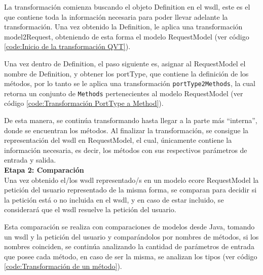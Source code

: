

La transformación comienza buscando el objeto Definition en el wsdl, este es el que contiene toda la información necesaria para poder llevar adelante la transformación. Una vez obtenido la Definition, le aplica una transformación model2Request, obteniendo de esta forma el modelo RequestModel (ver código \ref{code:Inicio de la transformación QVT}).



Una vez dentro de Definition, el paso siguiente es,  asignar al RequestModel el nombre de Definition, y obtener los portType, que contiene la definición de los métodos, por lo tanto se le aplica una transformación \texttt{portType2Methods}, la cual retorna un conjunto de \texttt{Methods} pertenecientes al modelo RequestModel (ver código \ref{code:Transformación PortType a Method}).



De esta manera, se continúa transformando hasta llegar a la parte más “interna”, donde se encuentran los métodos.  Al finalizar la transformación, se consigue la representación del wsdl en RequestModel, el cual, únicamente contiene la información necesaria, es decir, los métodos con sus respectivos parámetros de entrada y salida.\\

\textbf{Etapa 2: Comparación}\\

Una vez obtenido el/los wsdl representado/s en un modelo ecore RequestModel la petición del usuario representado de la misma forma, se comparan para decidir si la petición está o no incluida en el wsdl, y en caso de estar incluido, se considerará que el wsdl resuelve la petición del usuario.

Esta comparación se realiza con comparaciones de modelos desde Java, tomando un wsdl y la petición del usuario y comparándolos por nombres de métodos, si los nombres coinciden, se continúa analizando la cantidad de parámetros de entrada que posee cada método, en caso de ser la misma, se analizan los tipos (ver código \ref{code:Transformación de un método}).

